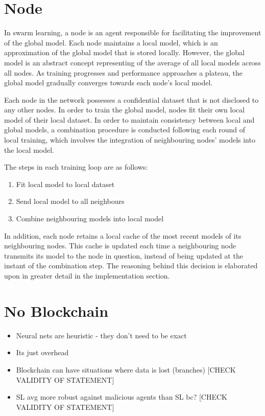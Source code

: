 \section{Node}
In swarm learning, a node is an agent responsible for facilitating the improvement of the global model. Each node maintains a local model, which is an approximation of the global model that is stored locally. However, the global model is an abstract concept representing of the average of all local models across all nodes. As training progresses and performance approaches a plateau, the global model gradually converges towards each node's local model.

Each node in the network possesses a confidential dataset that is not disclosed to any other nodes. In order to train the global model, nodes fit their own local model of their local dataset. In order to maintain consistency between local and global models, a combination procedure is conducted following each round of local training, which involves the integration of neighbouring nodes' models into the local model.

The steps in each training loop are as follows:
\begin{enumerate}
	\item Fit local model to local dataset
	\item Send local model to all neighbours
	\item Combine neighbouring models into local model
\end{enumerate}

In addition, each node retains a local cache of the most recent models of its neighbouring nodes. This cache is updated each time a neighbouring node transmits its model to the node in question, instead of being updated at the instant of the combination step. The reasoning behind this decision is elaborated upon in greater detail in the implementation section.

\section{No Blockchain}
\begin{itemize}
	\item Neural nets are heuristic - they don't need to be exact
	\item Its just overhead
	\item Blockchain can have situations where data is lost (branches) [CHECK VALIDITY OF STATEMENT]
	\item SL avg more robust against malicious agents than SL bc?  [CHECK VALIDITY OF STATEMENT]
\end{itemize}

